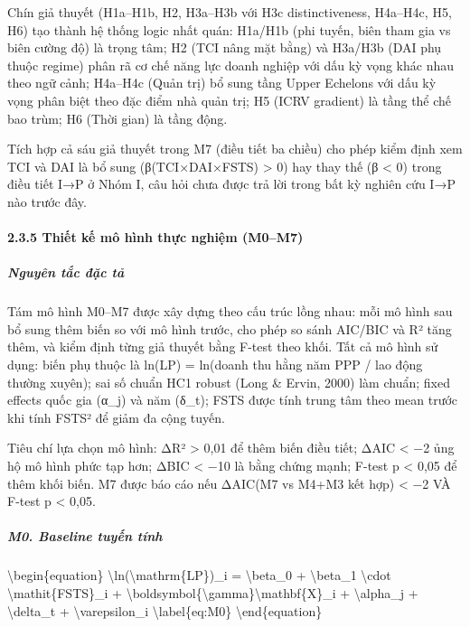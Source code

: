 \documentclass[12pt,a4paper]{article}
\begin{document}
Chín giả thuyết (H1a--H1b, H2, H3a--H3b với H3c distinctiveness,
H4a--H4c, H5, H6) tạo thành hệ thống logic nhất quán: H1a/H1b (phi
tuyến, biên tham gia vs biên cường độ) là trọng tâm; H2 (TCI nâng mặt
bằng) và H3a/H3b (DAI phụ thuộc regime) phân rã cơ chế năng lực doanh
nghiệp với dấu kỳ vọng khác nhau theo ngữ cảnh; H4a--H4c (Quản trị) bổ
sung tầng Upper Echelons với dấu kỳ vọng phân biệt theo đặc điểm nhà
quản trị; H5 (ICRV gradient) là tầng thể chế bao trùm; H6 (Thời gian) là
tầng động.

Tích hợp cả sáu giả thuyết trong M7 (điều tiết ba chiều) cho phép kiểm
định xem TCI và DAI là bổ sung (β(TCI×DAI×FSTS) \textgreater{} 0) hay
thay thế (β \textless{} 0) trong điều tiết I→P ở Nhóm I, câu hỏi chưa
được trả lời trong bất kỳ nghiên cứu I→P nào trước đây.

\hypertarget{235-thiux1ebft-kux1ebf-muxf4-huxecnh-thux1ef1c-nghiux1ec7m-m0m7}{%
\paragraph{2.3.5 Thiết kế mô hình thực nghiệm
(M0--M7)}\label{235-thiux1ebft-kux1ebf-muxf4-huxecnh-thux1ef1c-nghiux1ec7m-m0m7}}

\hypertarget{nguyuxean-tux1eafc-ux111ux1eb7c-tux1ea3}{%
\subparagraph{Nguyên tắc đặc
tả}\label{nguyuxean-tux1eafc-ux111ux1eb7c-tux1ea3}}

Tám mô hình M0--M7 được xây dựng theo cấu trúc lồng nhau: mỗi mô hình
sau bổ sung thêm biến so với mô hình trước, cho phép so sánh AIC/BIC và
R² tăng thêm, và kiểm định từng giả thuyết bằng F-test theo khối. Tất cả
mô hình sử dụng: biến phụ thuộc là ln(LP) = ln(doanh thu hằng năm PPP /
lao động thường xuyên); sai số chuẩn HC1 robust (Long \& Ervin, 2000)
làm chuẩn; fixed effects quốc gia (α\_j) và năm (δ\_t); FSTS được tính
trung tâm theo mean trước khi tính FSTS² để giảm đa cộng tuyến.

Tiêu chí lựa chọn mô hình: ΔR² \textgreater{} 0,01 để thêm biến điều
tiết; ΔAIC \textless{} −2 ủng hộ mô hình phức tạp hơn; ΔBIC \textless{}
−10 là bằng chứng mạnh; F-test p \textless{} 0,05 để thêm khối biến. M7
được báo cáo nếu ΔAIC(M7 vs M4+M3 kết hợp) \textless{} −2 VÀ F-test p
\textless{} 0,05.

\hypertarget{m0-baseline-tuyux1ebfn-tuxednh}{%
\subparagraph{M0. Baseline tuyến
tính}\label{m0-baseline-tuyux1ebfn-tuxednh}}

\textbackslash begin\{equation\}
\textbackslash ln(\textbackslash mathrm\{LP\})\_i =
\textbackslash beta\_0 + \textbackslash beta\_1 \textbackslash cdot
\textbackslash mathit\{FSTS\}\_i +
\textbackslash boldsymbol\{\textbackslash gamma\}\textquotesingle\textbackslash mathbf\{X\}\_i
+ \textbackslash alpha\_j + \textbackslash delta\_t +
\textbackslash varepsilon\_i \textbackslash label\{eq:M0\}
\textbackslash end\{equation\}
\end{document}
